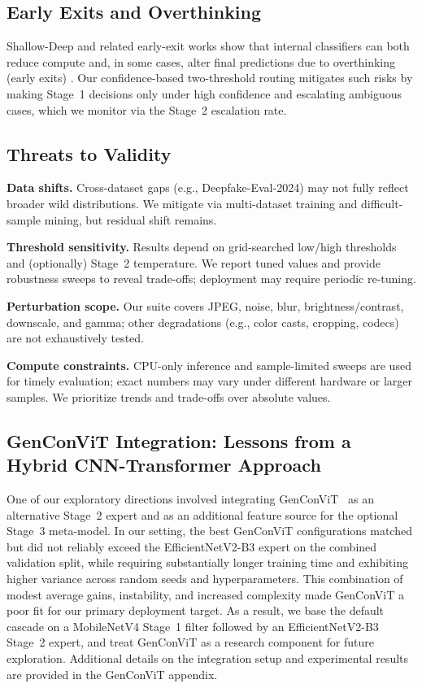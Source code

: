 \subsection*{Early Exits and Overthinking}
Shallow\hyp Deep and related early\hyp exit works show that internal classifiers can both reduce compute and, in some cases, alter final predictions due to overthinking (early exits) \cite{kaya2019shallowdeep}. Our confidence\hyp based two\hyp threshold routing mitigates such risks by making Stage~1 decisions only under high confidence and escalating ambiguous cases, which we monitor via the Stage~2 escalation rate.

\subsection*{Threats to Validity}
\textbf{Data shifts.} Cross\hyp dataset gaps (e.g., Deepfake\hyp Eval\hyp 2024) may not fully reflect broader wild distributions. We mitigate via multi\hyp dataset training and difficult\hyp sample mining, but residual shift remains.

\textbf{Threshold sensitivity.} Results depend on grid\hyp searched low/high thresholds and (optionally) Stage~2 temperature. We report tuned values and provide robustness sweeps to reveal trade\hyp offs; deployment may require periodic re\hyp tuning.

\textbf{Perturbation scope.} Our suite covers JPEG, noise, blur, brightness/contrast, downscale, and gamma; other degradations (e.g., color casts, cropping, codecs) are not exhaustively tested.

\textbf{Compute constraints.} CPU\hyp only inference and sample\hyp limited sweeps are used for timely evaluation; exact numbers may vary under different hardware or larger samples. We prioritize trends and trade\hyp offs over absolute values.

\subsection*{GenConViT Integration: Lessons from a Hybrid CNN-Transformer Approach}

One of our exploratory directions involved integrating GenConViT~\cite{genconvit_github} as an alternative Stage~2 expert and as an additional feature source for the optional Stage~3 meta\hyp model. In our setting, the best GenConViT configurations matched but did not reliably exceed the EfficientNetV2\hyp B3 expert on the combined validation split, while requiring substantially longer training time and exhibiting higher variance across random seeds and hyperparameters. This combination of modest average gains, instability, and increased complexity made GenConViT a poor fit for our primary deployment target. As a result, we base the default cascade on a MobileNetV4 Stage~1 filter followed by an EfficientNetV2\hyp B3 Stage~2 expert, and treat GenConViT as a research component for future exploration. Additional details on the integration setup and experimental results are provided in the GenConViT appendix.

